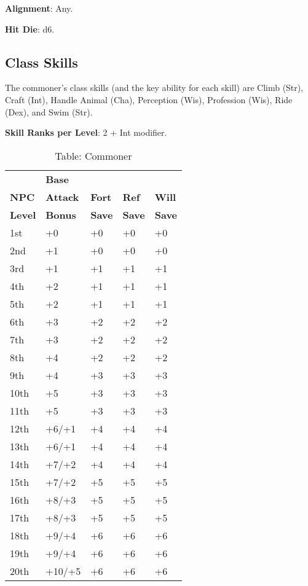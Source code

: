 				
\textbf{Alignment}: Any.
				
\textbf{Hit Die}: d6.
				
\subsection{Class Skills}

				
The commoner's class skills (and the key ability for each skill) are Climb (Str), Craft (Int), Handle Animal (Cha), Perception (Wis), Profession (Wis), Ride (Dex), and Swim (Str).
				
\textbf{Skill Ranks per Level}: 2 + Int modifier.
\begin{table}[]
\sffamily
\caption{Table: Commoner}
\begin{tabular}{lllll}
               & \textbf{Base} \\
\textbf{NPC}   & \textbf{Attack} & \textbf{Fort} & \textbf{Ref} & \textbf{Will}\\
\textbf{Level} & \textbf{Bonus} & \textbf{Save} & \textbf{Save} & \textbf{Save}\\
1st & +0 & +0 & +0 & +0\\
2nd & +1 & +0 & +0 & +0\\
3rd & +1 & +1 & +1 & +1\\
4th & +2 & +1 & +1 & +1\\
5th & +2 & +1 & +1 & +1\\
6th & +3 & +2 & +2 & +2\\
7th & +3 & +2 & +2 & +2\\
8th & +4 & +2 & +2 & +2\\
9th & +4 & +3 & +3 & +3\\
10th & +5 & +3 & +3 & +3\\
11th & +5 & +3 & +3 & +3\\
12th & +6/+1 & +4 & +4 & +4\\
13th & +6/+1 & +4 & +4 & +4\\
14th & +7/+2 & +4 & +4 & +4\\
15th & +7/+2 & +5 & +5 & +5\\
16th & +8/+3 & +5 & +5 & +5\\
17th & +8/+3 & +5 & +5 & +5\\
18th & +9/+4 & +6 & +6 & +6\\
19th & +9/+4 & +6 & +6 & +6\\
20th & +10/+5 & +6 & +6 & +6\\
\end{tabular}
\end{table}

